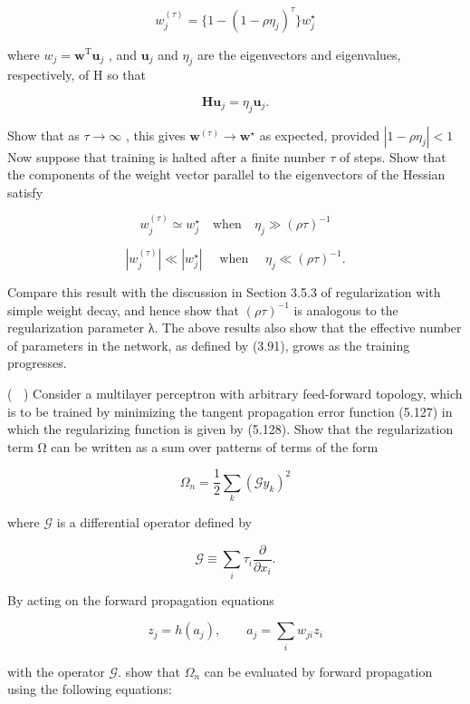 \documentclass[
  10
]{article}
\begin{document}
\[
w _ {j} ^ {(\tau)} = \{1 - (1 - \rho \eta_ {j}) ^ {\tau} \} w _ {j} ^ {\star}\tag{5.197}
\]

where
\(w _ { j } = \mathbf { w } ^ { \mathrm { T } } \mathbf { u } _ { j }\)
, and \(\mathbf { u } _ { j }\) and \(\eta _ { j }\) are the
eigenvectors and eigenvalues, respectively, of H so that

\[
\mathbf {H} \mathbf {u} _ {j} = \eta_ {j} \mathbf {u} _ {j}.\tag{5.198}
\]

Show that as \(\tau \to \infty\) , this gives
\(\mathbf { w } ^ { ( \tau ) } \to \mathbf { w } ^ { \star }\) as
expected, provided \(| 1 - \rho \eta _ { j } | < 1\) Now suppose that
training is halted after a finite number \(\tau\) of steps. Show that
the components of the weight vector parallel to the eigenvectors of the
Hessian satisfy

\[
w _ {j} ^ {(\tau)} \simeq w _ {j} ^ {\star} \quad \mathrm{when} \quad \eta_ {j} \gg (\rho \tau) ^ {- 1}\tag{5.199}
\]

\[
| w _ {j} ^ {(\tau)} | \ll | w _ {j} ^ {\star} | \quad \text { when } \quad \eta_ {j} \ll (\rho \tau) ^ {- 1}.\tag{5.200}
\]

Compare this result with the discussion in Section 3.5.3 of
regularization with simple weight decay, and hence show that
\(( \rho \tau ) ^ { - 1 }\) is analogous to the regularization parameter
λ. The above results also show that the effective number of parameters
in the network, as defined by (3.91), grows as the training progresses.

( ) Consider a multilayer perceptron with arbitrary feed-forward
topology, which is to be trained by minimizing the tangent propagation
error function (5.127) in which the regularizing function is given by
(5.128). Show that the regularization term Ω can be written as a sum
over patterns of terms of the form

\[
\Omega_ {n} = \frac {1}{2} \sum_ {k} (\mathcal {G} y _ {k}) ^ {2}\tag{5.201}
\]

where \(\mathcal { G }\) is a differential operator defined by

\[
\mathcal {G} \equiv \sum_ {i} \tau_ {i} \frac {\partial}{\partial x _ {i}}.\tag{5.202}
\]

By acting on the forward propagation equations

\[
z _ {j} = h (a _ {j}), \qquad a _ {j} = \sum_ {i} w _ {j i} z _ {i}\tag{5.203}
\]

with the operator \({ \mathcal { G } } .\) show that \(\Omega _ { n }\)
can be evaluated by forward propagation using the following equations:
\end{document}
